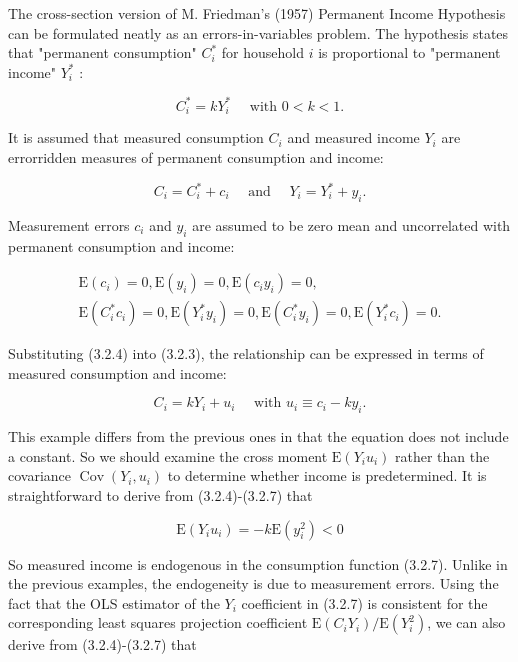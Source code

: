 \documentclass[10pt]{article}
\begin{document}
The cross-section version of M. Friedman's (1957) Permanent Income Hypothesis can be formulated neatly as an errors-in-variables problem. The hypothesis states that "permanent consumption" $C_{i}^{*}$ for household $i$ is proportional to "permanent income" $Y_{i}^{*}$ :


\begin{equation*}
C_{i}^{*}=k Y_{i}^{*} \quad \text { with } 0<k<1 . \tag{3.2.3}
\end{equation*}


It is assumed that measured consumption $C_{i}$ and measured income $Y_{i}$ are errorridden measures of permanent consumption and income:


\begin{equation*}
C_{i}=C_{i}^{*}+c_{i} \quad \text { and } \quad Y_{i}=Y_{i}^{*}+y_{i} . \tag{3.2.4}
\end{equation*}


Measurement errors $c_{i}$ and $y_{i}$ are assumed to be zero mean and uncorrelated with permanent consumption and income:


\begin{gather*}
\mathrm{E}\left(c_{i}\right)=0, \mathrm{E}\left(y_{i}\right)=0, \mathrm{E}\left(c_{i} y_{i}\right)=0,  \tag{3.2.5}\\
\mathrm{E}\left(C_{i}^{*} c_{i}\right)=0, \mathrm{E}\left(Y_{i}^{*} y_{i}\right)=0, \mathrm{E}\left(C_{i}^{*} y_{i}\right)=0, \mathrm{E}\left(Y_{i}^{*} c_{i}\right)=0 . \tag{3.2.6}
\end{gather*}


Substituting (3.2.4) into (3.2.3), the relationship can be expressed in terms of measured consumption and income:


\begin{equation*}
C_{i}=k Y_{i}+u_{i} \quad \text { with } u_{i} \equiv c_{i}-k y_{i} . \tag{3.2.7}
\end{equation*}


This example differs from the previous ones in that the equation does not include a constant. So we should examine the cross moment $\mathrm{E}\left(Y_{i} u_{i}\right)$ rather than the covariance $\operatorname{Cov}\left(Y_{i}, u_{i}\right)$ to determine whether income is predetermined. It is straightforward to derive from (3.2.4)-(3.2.7) that

$$
\mathrm{E}\left(Y_{i} u_{i}\right)=-k \mathrm{E}\left(y_{i}^{2}\right)<0
$$

So measured income is endogenous in the consumption function (3.2.7). Unlike in the previous examples, the endogeneity is due to measurement errors. Using the fact that the OLS estimator of the $Y_{i}$ coefficient in (3.2.7) is consistent for the corresponding least squares projection coefficient $\mathrm{E}\left(C_{i} Y_{i}\right) / \mathrm{E}\left(Y_{i}^{2}\right)$, we can also derive from (3.2.4)-(3.2.7) that
\end{document}
